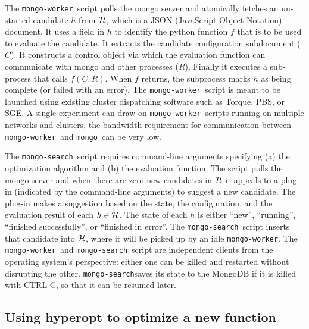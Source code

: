 \documentclass{article}
\newcommand{\mongo}{{\tt mongo}}
\newcommand{\mongoworker}{{\tt mongo-worker}}
\newcommand{\mongosearch}{{\tt mongo-search}}
\begin{document}
The \mongoworker\ script polls the mongo server and
atomically fetches an un-started candidate $h$ from ${\cal H}$, which is a JSON (JavaScript Object Notation) document.
It uses a field in $h$ to identify the python function $f$ that is to be used to evaluate the candidate.
It extracts the candidate configuration subdocument ($C$).
It constructs a control object via which the evaluation function can communicate with mongo and other processes ($R$).
Finally it executes a sub-process that calls $f(C, R)$.
When $f$ returns, the subprocess marks $h$ as being complete (or failed with an error).
The \mongoworker\ script is meant to be launched using existing cluster dispatching software such as Torque, PBS, or SGE.
A single experiment can draw on \mongoworker\ scripts running on multiple networks and clusters,
the bandwidth requirement for communication between \mongoworker\ and \mongo\ can be very low.

The \mongosearch\ script requires command-line arguments specifying
(a) the optimization algorithm and
(b) the evaluation function.
The script polls the mongo server
and when there are zero new candidates in ${\cal H}$ it appeals to a plug-in (indicated by the command-line arguments)
to suggest a new candidate.
The plug-in makes a suggestion based on the state, the configuration, and the evaluation result of each $h \in {\cal H}$.
The state of each $h$ is either ``new'', ``running'', ``finished successfully'', or ``finished in error''.
The \mongosearch\ script inserts that candidate into ${\cal H}$, where it will be picked up by an idle \mongoworker.
The \mongoworker\ and \mongosearch\ script are independent clients from the operating system's perspective:
either one can be killed and restarted without disrupting the other.
\mongosearch saves its state to the MongoDB if it is killed with CTRL-C, so that it can be resumed later.

\subsection{Using hyperopt to optimize a new function}
\end{document}
